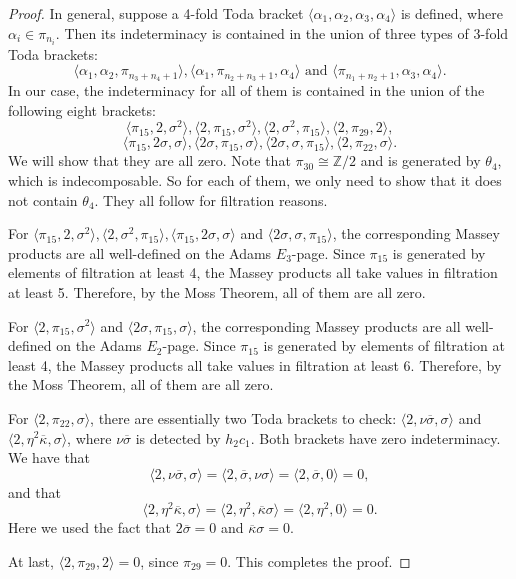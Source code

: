 \documentclass[psamsfonts]{amsart}
\theoremstyle{definition}
\numberwithin{equation}{section}
\begin{document}
\begin{proof}
In general, suppose a 4-fold Toda bracket $\langle \alpha_1, \alpha_2, \alpha_3, \alpha_4\rangle$ is defined, where $\alpha_i\in\pi_{n_i}$. Then its indeterminacy is contained in the union of three types of 3-fold Toda brackets:
$$\langle \alpha_1, \alpha_2, \pi_{n_3+n_4+1}\rangle, \langle \alpha_1, \pi_{n_2+n_3+1}, \alpha_4\rangle \text{~and~} \langle \pi_{n_1+n_2+1}, \alpha_3, \alpha_4\rangle. $$
In our case, the indeterminacy for all of them is contained in the union of the following eight brackets:
$$\langle\pi_{15},2, \sigma^2\rangle, \langle 2, \pi_{15}, \sigma^2\rangle, \langle 2, \sigma^2, \pi_{15}\rangle, \langle 2, \pi_{29}, 2\rangle, $$
$$\langle \pi_{15}, 2\sigma, \sigma\rangle, \langle 2\sigma, \pi_{15}, \sigma\rangle, \langle 2\sigma, \sigma, \pi_{15}\rangle, \langle 2, \pi_{22}, \sigma\rangle.$$
We will show that they are all zero. Note that $\pi_{30}\cong \mathbb{Z}/2$ and is generated by $\theta_4$, which is indecomposable. So for each of them, we only need to show that it does not contain $\theta_4$. They all follow for filtration reasons.

For $\langle\pi_{15},2, \sigma^2\rangle,\langle 2, \sigma^2, \pi_{15}\rangle,\langle \pi_{15}, 2\sigma, \sigma\rangle$ and $\langle 2\sigma, \sigma, \pi_{15}\rangle$, the corresponding Massey products are all well-defined on the Adams $E_3$-page. Since $\pi_{15}$ is generated by elements of filtration at least 4, the Massey products all take values in filtration at least 5. Therefore, by the Moss Theorem, all of them are all zero.

For $\langle 2, \pi_{15}, \sigma^2\rangle$ and $\langle 2\sigma, \pi_{15}, \sigma\rangle$, the corresponding Massey products are all well-defined on the Adams $E_2$-page. Since $\pi_{15}$ is generated by elements of filtration at least 4, the Massey products all take values in filtration at least 6. Therefore, by the Moss Theorem, all of them are all zero.

For $\langle 2, \pi_{22}, \sigma\rangle$, there are essentially two Toda brackets to check: $\langle 2, \nu\overline{\sigma}, \sigma\rangle$ and $\langle 2, \eta^2\overline{\kappa}, \sigma\rangle$, where $\nu\overline{\sigma}$ is detected by $h_2c_1$. Both brackets have zero indeterminacy. We have that
$$\langle 2, \nu\overline{\sigma}, \sigma\rangle=\langle 2, \overline{\sigma}, \nu\sigma\rangle=\langle 2, \overline{\sigma}, 0\rangle=0,$$
and that
$$\langle 2, \eta^2\overline{\kappa}, \sigma\rangle=\langle 2, \eta^2, \overline{\kappa}\sigma\rangle=\langle 2, \eta^2, 0\rangle=0.$$
Here we used the fact that $2 \overline{\sigma}=0$ and $\overline{\kappa}\sigma=0$.

At last, $\langle 2, \pi_{29}, 2\rangle=0$, since $\pi_{29}=0$. This completes the proof.
\end{proof}
\end{document}
